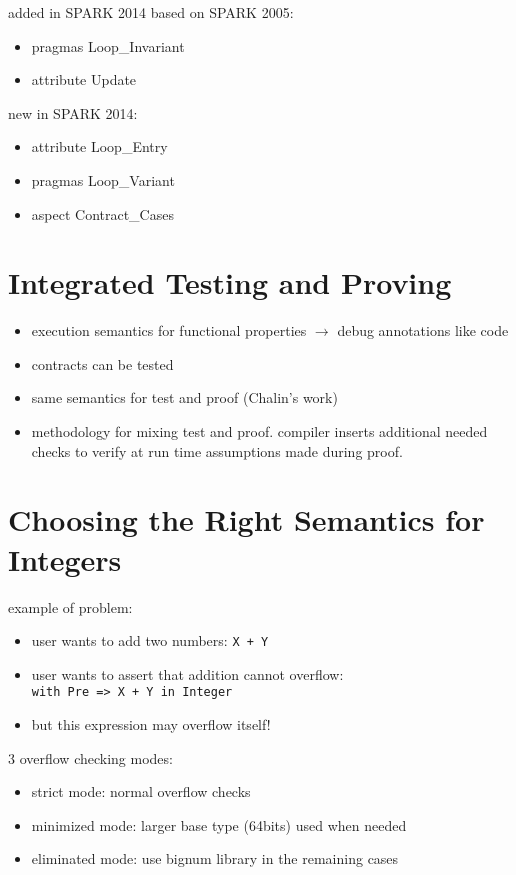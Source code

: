 \documentclass[sttt,draft]{svjour}
\begin{document}
\noindent
added in SPARK 2014 based on SPARK 2005:
\begin{itemize}
\item pragmas Loop\_Invariant
\item attribute Update
\end{itemize}

\noindent
new in SPARK 2014:
\begin{itemize}
\item attribute Loop\_Entry
\item pragmas Loop\_Variant
\item aspect Contract\_Cases
\end{itemize}

\section{Integrated Testing and Proving}
\label{hilite}

\begin{itemize}
\item execution semantics for functional properties $\rightarrow$ debug
  annotations like code
\item contracts can be tested
\item same semantics for test and proof (Chalin's work)
\item methodology for mixing test and proof. compiler inserts additional needed
  checks to verify at run time assumptions made during proof.
\end{itemize}

\section{Choosing the Right Semantics for Integers}
\label{overflowsemantics}

example of problem:
\begin{itemize}
\item user wants to add two numbers: \verb|X + Y|
\item user wants to assert that addition cannot overflow:\\
  \verb|with Pre => X + Y in Integer|
\item but this expression may overflow itself!
\end{itemize}

3 overflow checking modes:
\begin{itemize}
\item strict mode: normal overflow checks
\item minimized mode: larger base type (64bits) used when needed
\item eliminated mode: use bignum library in the remaining cases
\end{itemize}
\end{document}
